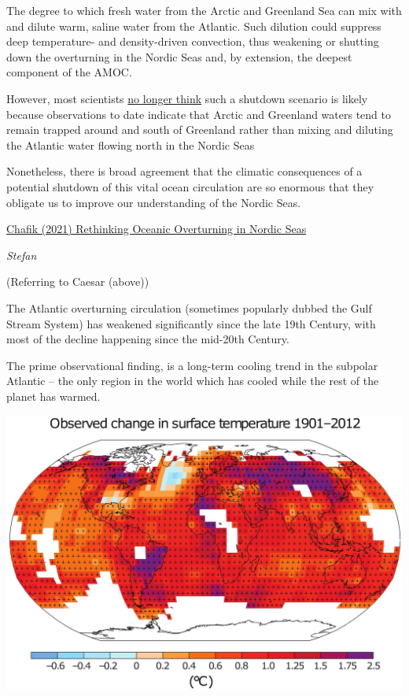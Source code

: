 \documentclass[
]{book}
\begin{document}
The degree to which fresh water from the Arctic and Greenland Sea can mix with and dilute warm, saline water from the Atlantic. Such dilution could suppress deep temperature- and density-driven convection, thus weakening or shutting down the overturning in the Nordic Seas and, by extension, the deepest component of the AMOC.

However, most scientists \href{https://www.carbonbrief.org/guest-post-could-the-atlantic-overturning-circulation-shut-down}{no longer think} such a shutdown scenario is likely because observations to date indicate that Arctic and Greenland waters tend to remain trapped around and south of Greenland rather than mixing and diluting the Atlantic water flowing north in the Nordic Seas

Nonetheless, there is broad agreement that the climatic consequences of a potential shutdown of this vital ocean circulation are so enormous that they obligate us to improve our understanding of the Nordic Seas.

\href{https://eos.org/science-updates/rethinking-oceanic-overturning-in-the-nordic-seas\#.YHvKO1RSYTk.twitter}{Chafik (2021) Rethinking Oceanic Overturning in Nordic Seas}

\emph{Stefan}

(Referring to Caesar (above))

The Atlantic overturning circulation (sometimes popularly dubbed the Gulf Stream System) has weakened significantly since the late 19th Century, with most of the decline happening since the mid-20th Century.

The prime observational finding, is a long-term cooling trend in the subpolar Atlantic -- the only region in the world which has cooled while the rest of the planet has warmed.

\includegraphics{fig/North_Atlantic_CoolinG_AR5-Fig-SPM1.jpg}
\end{document}
